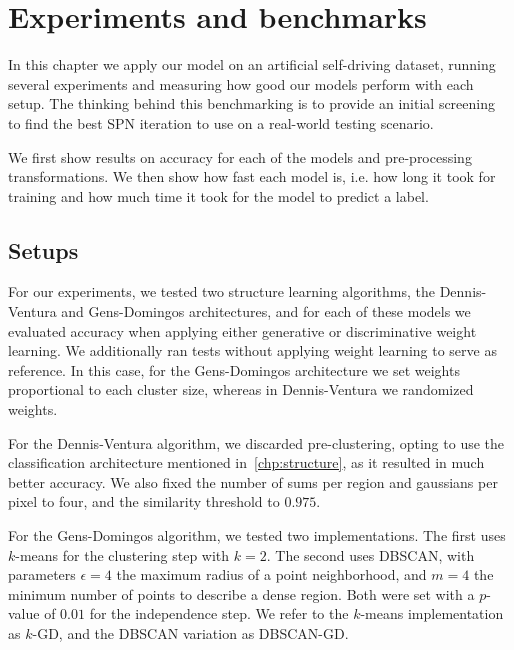 
\chapter{Experiments and benchmarks}\label{chp:benchmarks}

In this chapter we apply our model on an artificial self-driving dataset, running several
experiments and measuring how good our models perform with each setup. The thinking behind this
benchmarking is to provide an initial screening to find the best SPN iteration to use on a
real-world testing scenario.

We first show results on accuracy for each of the models and pre-processing transformations.
We then show how fast each model is, i.e. how long it took for training and how much time it took
for the model to predict a label.

\section{Setups}

For our experiments, we tested two structure learning algorithms, the Dennis-Ventura and
Gens-Domingos architectures, and for each of these models we evaluated accuracy when applying
either generative or discriminative weight learning. We additionally ran tests without applying
weight learning to serve as reference. In this case, for the Gens-Domingos architecture we set
weights proportional to each cluster size, whereas in Dennis-Ventura we randomized weights.

For the Dennis-Ventura algorithm, we discarded pre-clustering, opting to use the classification
architecture mentioned in~\autoref{chp:structure}, as it resulted in much better accuracy. We also
fixed the number of sums per region and gaussians per pixel to four, and the similarity threshold
to $0.975$.

For the Gens-Domingos algorithm, we tested two implementations. The first uses $k$-means for the
clustering step with $k=2$. The second uses DBSCAN, with parameters $\epsilon=4$ the maximum radius
of a point neighborhood, and $m=4$ the minimum number of points to describe a dense region. Both
were set with a $p$-value of $0.01$ for the independence step. We refer to the $k$-means
implementation as $k$-GD, and the DBSCAN variation as DBSCAN-GD.

